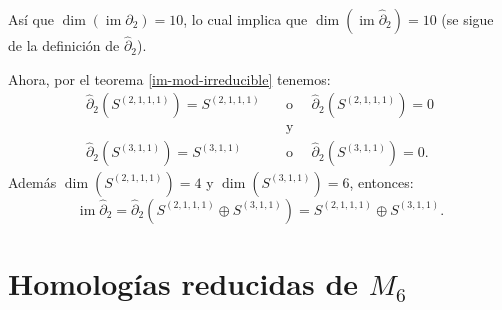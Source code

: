 \documentclass[12pt]{book}
\theoremstyle{definition}
\DeclareMathOperator{\im}{im}
\newcounter{in}
\newcounter{ini}
\begin{document}
Así que $\dim(\im\partial_{2})=10$, lo cual implica que
$\dim(\im\widehat\partial_{2})=10$ (se sigue de la definición de
$\widehat\partial_{2}$).

Ahora, por el teorema \ref{im-mod-irreducible} tenemos:
\begin{align*}
\widehat\partial_{2}(S^{(2,1,1,1)})=S^{(2,1,1,1)} \quad & \mbox{o }\quad \widehat\partial_{2}(S^{(2,1,1,1)})=0\\
&\mbox{y}\\
\widehat\partial_{2}(S^{(3,1,1)})=S^{(3,1,1)} \quad & \mbox{o }\quad \widehat\partial_{2}(S^{(3,1,1)})=0.
\end{align*}
Además $\dim(S^{(2,1,1,1)})=4$ y $\dim(S^{(3,1,1)})=6$, entonces:
$$\im\widehat\partial_{2}=\widehat\partial_{2}(S^{(2,1,1,1)}\oplus S^{(3,1,1)})=S^{(2,1,1,1)}\oplus S^{(3,1,1)}.$$

\section{Homologías reducidas de $M_{6}$}
\label{hom-red-M6}
\end{document}
